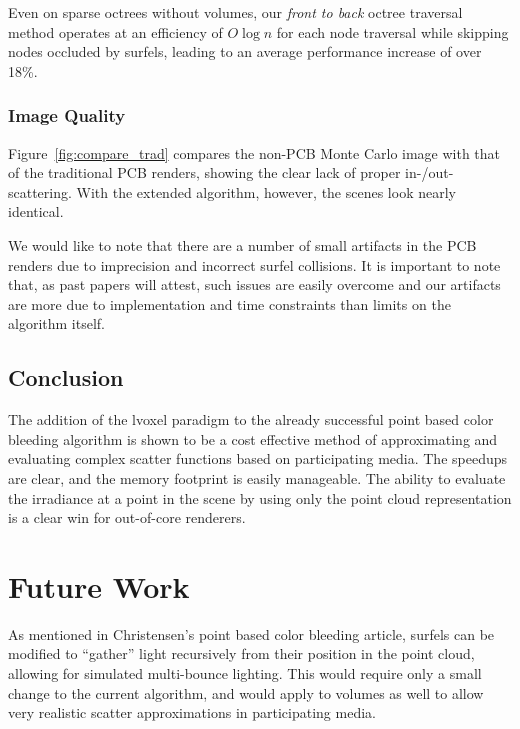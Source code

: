 \documentclass[12pt]{ucthesis}
\begin{document}
Even on sparse octrees without volumes, our \textit{front to back} octree traversal method operates at an efficiency of $O\log{n}$ for each node traversal while skipping nodes occluded by surfels, leading to an average performance increase of over 18\%.

\subsection*{Image Quality}
Figure~\ref{fig:compare_trad} compares the non-PCB Monte Carlo image with that of the traditional PCB renders, showing the clear lack of proper in-/out-scattering.  With the extended algorithm, however, the scenes look nearly identical.

We would like to note that there are a number of small artifacts in the PCB renders due to imprecision and incorrect surfel collisions.  It is important to note that, as past papers will attest, such issues are easily overcome and our artifacts are more due to implementation and time constraints than limits on the algorithm itself.

\section{Conclusion}

The addition of the lvoxel paradigm to the already successful point based color bleeding algorithm is shown to be a cost effective method of approximating and evaluating complex scatter functions based on participating media.  The speedups are clear, and the memory footprint is easily manageable.  The ability to evaluate the irradiance at a point in the scene by using only the point cloud representation is a clear win for out-of-core renderers.

\chapter{Future Work}


As mentioned in Christensen's point based color bleeding article, surfels can be modified to ``gather'' light recursively from their position in the point cloud, allowing for simulated multi-bounce lighting.  This would require only a small change to the current algorithm, and would apply to volumes as well to allow very realistic scatter approximations in participating media.
\end{document}
